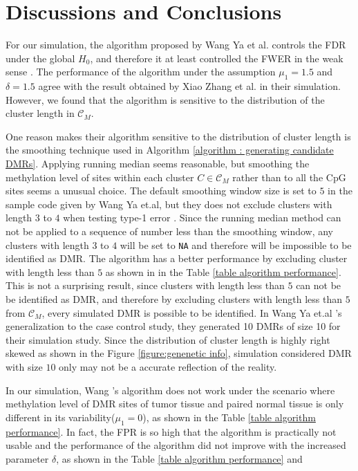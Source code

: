 \documentclass{report}
\begin{document}
\section{Discussions and Conclusions}
\par
For our simulation, the algorithm proposed by Wang Ya et al.\cite{wang2017accounting} controls the FDR under the global $H_0$, and therefore it at least
controlled the FWER in the weak sense \cite{benjamini1995controlling}. The performance of the algorithm under the assumption $\mu_1 =1.5$ and $\delta =1.5$
agree with the result obtained by Xiao Zhang et al. \cite{zhang2018data} in their simulation. However, we found that the algorithm is  sensitive to
the distribution of the cluster length in $\mathcal{C}_M$.
\par
One reason makes their algorithm sensitive to the distribution of cluster length is the smoothing technique used in Algorithm \ref{algorithm : generating candidate DMRs}. Applying running median seems reasonable\cite{wu2015detection,hansen2012bsmooth}, but
smoothing the methylation level of sites within each cluster $C \in \mathcal{C}_M$ rather than to all the CpG sites seems a unusual choice. The default
smoothing window size is set to $5$ in the sample code given by Wang Ya et.al, but they does not exclude clusters
with length $3$ to $4$ when testing type-1 error \cite{wang2017accounting}. Since the running median method can not
be applied to a sequence of number less than the smoothing window, any clusters with length $3$ to $4$ will be set
to \verb|NA| and therefore will be impossible to be identified as DMR. The algorithm has a better performance by excluding cluster with length less than $5$ as shown in in the Table \ref{table algorithm performance}. This is not a surprising result, since clusters with length less than $5$ can not be be identified as DMR, and therefore by excluding clusters with length less than $5$ from $\mathcal{C}_M$, every simulated DMR is possible to be identified.
In Wang Ya et.al 's generalization to the case control study, they generated 10 DMRs of size 10 for their simulation study. Since the distribution of cluster length is highly right skewed as shown in the Figure \ref{figure:genenetic info}, simulation considered DMR with size $10$ only may not be a accurate reflection of the reality.
\par
In our simulation, Wang 's algorithm does not work under the scenario where methylation level of DMR sites of tumor tissue and paired normal tissue is only different in its variability($\mu_1 = 0$), as shown in the Table \ref{table algorithm performance}. In fact, the FPR is so high that the algorithm is practically not usable and the performance of the algorithm did not improve with the increased parameter $\delta$, as shown in the Table \ref{table algorithm performance} and
\end{document}
